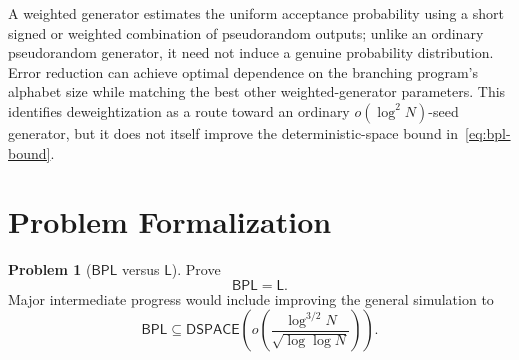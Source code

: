 \documentclass[10pt,a4paper]{article}
\theoremstyle{definition}
\newtheorem*{problem*}{Problem}
\newcommand{\Lclass}{\mathsf{L}}
\newcommand{\BPL}{\mathsf{BPL}}
\newcommand{\DSPACE}{\mathsf{DSPACE}}
\begin{document}
A weighted generator estimates the uniform acceptance probability using a
short signed or weighted combination of pseudorandom outputs; unlike an
ordinary pseudorandom generator, it need not induce a genuine probability
distribution. Error reduction can achieve optimal dependence on the branching
program's alphabet size while matching the best other weighted-generator
parameters. This identifies deweightization as a route toward an ordinary
$o(\log^2N)$-seed generator, but it does not itself improve
the deterministic-space bound in~\eqref{eq:bpl-bound}.

\section{Problem Formalization}

\begin{problem*}[$\BPL$ versus $\Lclass$]
Prove
\begin{equation}
  \BPL=\Lclass.
\end{equation}
Major intermediate progress would include improving the general simulation
to
\begin{equation}
  \BPL
  \subseteq
  \DSPACE\left(
    o\left(\frac{\log^{3/2}N}{\sqrt{\log\log N}}\right)
  \right).
\end{equation}
\end{problem*}
\end{document}
